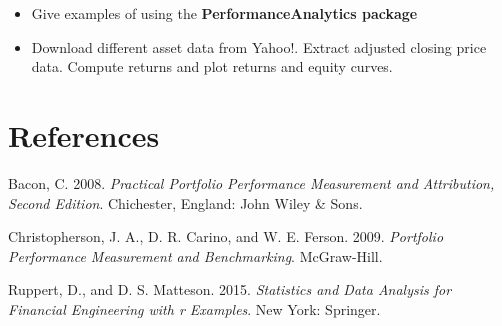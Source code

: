 \documentclass[
  letterpaper,
  DIV=11,
  numbers=noendperiod]{scrreprt}
\providecommand{\tightlist}{%
  \setlength{\itemsep}{0pt}\setlength{\parskip}{0pt}}\usepackage{longtable,booktabs,array}
\newlength{\cslhangindent}
\newlength{\cslentryspacingunit} %
\newenvironment{CSLReferences}[2] %
 {%
  \setlength{\parindent}{0pt}
  \ifodd #1
  \let\oldpar\par
  \def\par{\hangindent=\cslhangindent\oldpar}
  \fi
  \setlength{\parskip}{#2\cslentryspacingunit}
 }%
 {}
\theoremstyle{definition}
\theoremstyle{definition}
\theoremstyle{remark}
\begin{document}
\begin{itemize}
\tightlist
\item
  Give examples of using the \textbf{PerformanceAnalytics package}
\item
  Download different asset data from Yahoo!. Extract adjusted closing
  price data. Compute returns and plot returns and equity curves.
\end{itemize}


\hypertarget{references}{%
\chapter*{References}\label{references}}


\hypertarget{refs}{}
\begin{CSLReferences}{1}{0}
\leavevmode{}%
Bacon, C. 2008. \emph{Practical Portfolio Performance Measurement and
Attribution, Second Edition}. Chichester, England: John Wiley \& Sons.

\leavevmode{}%
Christopherson, J. A., D. R. Carino, and W. E. Ferson. 2009.
\emph{Portfolio Performance Measurement and Benchmarking}. McGraw-Hill.

\leavevmode{}%
Ruppert, D., and D. S. Matteson. 2015. \emph{Statistics and Data
Analysis for Financial Engineering with r Examples}. New York: Springer.

\end{CSLReferences}
\end{document}
